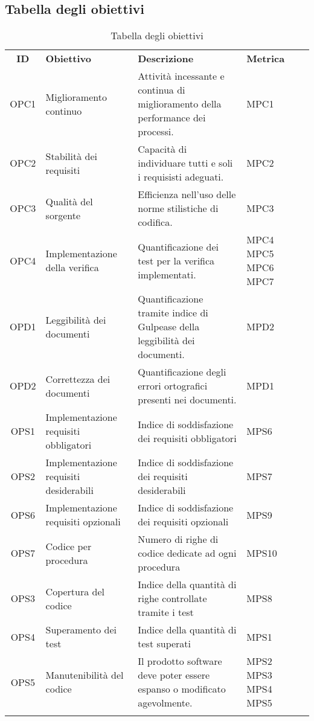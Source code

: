 \subsection{Tabella degli obiettivi}

\begin{longtable}{| c | p{3cm} | p{5cm} | p{2cm} | p{3cm} |}
	\rowcolor{LightBlue}
	\color{white}\bfseries ID & \color{white}\bfseries Obiettivo & \color{white}\bfseries Descrizione & \color{white}\bfseries Metrica \\[0.25cm]
	OPC1 & Miglioramento continuo & Attività incessante e continua di miglioramento della performance dei processi. & MPC1\\ \hline
	OPC2 & Stabilità dei requisiti & Capacità di individuare tutti e soli i requisisti adeguati. & MPC2  \\ \hline
	OPC3 & Qualità del sorgente & Efficienza nell'uso delle norme stilistiche di codifica. & MPC3 \\ \hline
	OPC4 & Implementazione della verifica & Quantificazione dei test per la verifica implementati. & MPC4 \newline MPC5 \newline MPC6 \newline MPC7 \\ \hline
	OPD1 & Leggibilità dei documenti & Quantificazione tramite indice di Gulpease della leggibilità dei documenti. & MPD2 \\ \hline
	OPD2 & Correttezza dei documenti & Quantificazione degli errori ortografici presenti nei documenti. & MPD1  \\ \hline
	OPS1 & Implementazione requisiti obbligatori & Indice di soddisfazione dei requisiti obbligatori & MPS6 \\ \hline
	OPS2 & Implementazione requisiti desiderabili & Indice di soddisfazione dei requisiti desiderabili & MPS7 \\ \hline
	OPS6 & Implementazione requisiti opzionali & Indice di soddisfazione dei requisiti opzionali & MPS9 \\ \hline
	OPS7 & Codice per procedura & Numero di righe di codice dedicate ad ogni procedura & MPS10 \\ \hline
	OPS3 & Copertura del codice & Indice della quantità di righe controllate tramite i test & MPS8 \\ \hline
	OPS4 & Superamento dei test & Indice della quantità di test superati & MPS1 \\ \hline
	OPS5 & Manutenibilità del codice & Il prodotto software deve poter essere espanso o modificato agevolmente. & MPS2 \newline MPS3 \newline MPS4 \newline MPS5\\ \hline 
	\caption{Tabella degli obiettivi} 
\end{longtable}